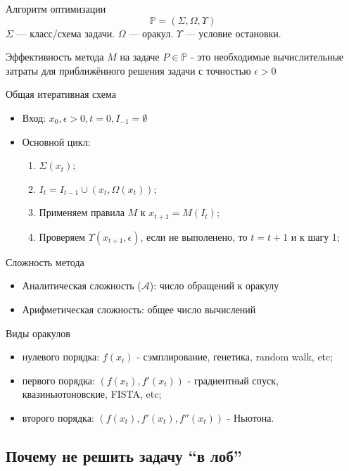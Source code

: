 \documentclass[14pt, fleqn, xcolor={dvipsnames, table}]{beamer}
\begin{document}
\begin{frame}{Алгоритм оптимизации}
  $$
  \mathbb{P} = (\Sigma, \Omega, \Upsilon)
  $$
  $\Sigma$ --- класс/схема задачи. $\Omega$ --- оракул. $\Upsilon$ --- условие остановки.

  Эффективность метода $M$ на задаче $P \in \mathbb{P}$ - это необходимые вычислительные затраты для приближённого решения задачи с точностью $\epsilon > 0$
\end{frame}

\begin{frame}{Общая итеративная схема}
\begin{itemize}
   \item Вход: $x_0, \epsilon > 0, t = 0, I_{-1} = \emptyset$ 
   \item Основной цикл:
    \begin{enumerate}
      \item $\Sigma(x_t)$;
      \item $I_t = I_{t-1} \cup (x_t, \Omega(x_t))$;
      \item Применяем правила $M$ к $x_{t+1} = M(I_t)$;
      \item Проверяем $\Upsilon(x_{t+1}, \epsilon)$, если не выполенено, то $t=t+1$ и к шагу 1;
    \end{enumerate}
\end{itemize}
\end{frame}

\begin{frame}{Сложность метода}
\begin{itemize}
   \item Аналитическая сложность ($\mathcal{A}$): число обращений к оракулу
   \item Арифметическая сложность: общее число вычислений
\end{itemize}
\end{frame}

\begin{frame}{Виды оракулов}
\begin{itemize}
   \item нулевого порядка: $f(x_t)$ - сэмплирование, генетика, random walk, etc;
   \item первого порядка: $(f(x_t), f'(x_t))$ - градиентный спуск, квазиньютоновские, FISTA, etc;
   \item второго порядка: $(f(x_t), f'(x_t), f''(x_t))$ - Ньютона.
\end{itemize}
\end{frame}

\subsection{Почему не решить задачу ``в лоб''}
\end{document}
